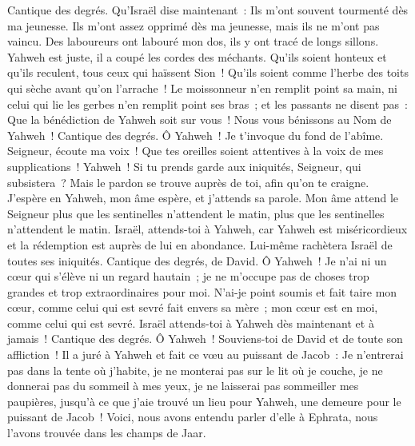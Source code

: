 \begin{multicols}{2}
\VerseOne{}Cantique des degrés. Qu'Israël dise maintenant~: Ils m'ont souvent tourmenté dès ma jeunesse.
Ils m'ont assez opprimé dès ma jeunesse, mais ils ne m'ont pas vaincu.
Des laboureurs ont labouré mon dos, ils y ont tracé de longs sillons.
Yahweh est juste, il a coupé les cordes des méchants.
Qu'ils soient honteux et qu'ils reculent, tous ceux qui haïssent Sion~!
Qu'ils soient comme l'herbe des toits qui sèche avant qu'on l'arrache~!
Le moissonneur n'en remplit point sa main, ni celui qui lie les gerbes n'en remplit point ses bras~;
et les passants ne disent pas~: Que la bénédiction de Yahweh soit sur vous~! Nous vous bénissons au Nom de Yahweh~!
\VerseOne{}Cantique des degrés. Ô Yahweh~! Je t'invoque du fond de l'abîme.
Seigneur, écoute ma voix~! Que tes oreilles soient attentives à la voix de mes supplications~!
Yahweh~! Si tu prends garde aux iniquités, Seigneur, qui subsistera~?
Mais le pardon se trouve auprès de toi, afin qu'on te craigne.
J'espère en Yahweh, mon âme espère, et j'attends sa parole.
Mon âme attend le Seigneur plus que les sentinelles n'attendent le matin, plus que les sentinelles n'attendent le matin.
Israël, attends-toi à Yahweh, car Yahweh est miséricordieux et la rédemption est auprès de lui en abondance.
Lui-même rachètera Israël de toutes ses iniquités.
\VerseOne{}Cantique des degrés, de David. Ô Yahweh~! Je n'ai ni un cœur qui s'élève ni un regard hautain~; je ne m'occupe pas de choses trop grandes et trop extraordinaires pour moi.
N'ai-je point soumis et fait taire mon cœur, comme celui qui est sevré fait envers sa mère~; mon cœur est en moi, comme celui qui est sevré.
Israël attends-toi à Yahweh dès maintenant et à jamais~!
\VerseOne{}Cantique des degrés. Ô Yahweh~! Souviens-toi de David et de toute son affliction~!
Il a juré à Yahweh et fait ce vœu au puissant de Jacob~:
Je n'entrerai pas dans la tente où j'habite, je ne monterai pas sur le lit où je couche,
je ne donnerai pas du sommeil à mes yeux, je ne laisserai pas sommeiller mes paupières,
jusqu'à ce que j'aie trouvé un lieu pour Yahweh, une demeure pour le puissant de Jacob~!
Voici, nous avons entendu parler d'elle à Ephrata, nous l'avons trouvée dans les champs de Jaar.

\end{multicols}
